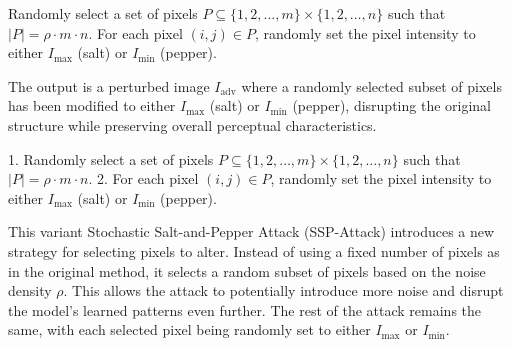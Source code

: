 Randomly select a set of pixels $P \subseteq \{1, 2, \ldots, m\} \times \{1, 2, \ldots, n\}$ such that $|P| = \rho \cdot m \cdot n$.
For each pixel $(i, j) \in P$, randomly set the pixel intensity to either $I_{\text{max}}$ (salt) or $I_{\text{min}}$ (pepper).

The output is a perturbed image $I_{\text{adv}}$ where a randomly selected subset of pixels has been modified to either $I_{\text{max}}$ (salt) or $I_{\text{min}}$ (pepper), disrupting the original structure while preserving overall perceptual characteristics.

1. Randomly select a set of pixels $P \subseteq \{1, 2, \ldots, m\} \times \{1, 2, \ldots, n\}$ such that $|P| = \rho \cdot m \cdot n$.
2. For each pixel $(i, j) \in P$, randomly set the pixel intensity to either $I_{\text{max}}$ (salt) or $I_{\text{min}}$ (pepper).

This variant Stochastic Salt-and-Pepper Attack (SSP-Attack) introduces a new strategy for selecting pixels to alter. Instead of using a fixed number of pixels as in the original method, it selects a random subset of pixels based on the noise density $\rho$. This allows the attack to potentially introduce more noise and disrupt the model's learned patterns even further. The rest of the attack remains the same, with each selected pixel being randomly set to either $I_{\text{max}}$ or $I_{\text{min}}$.